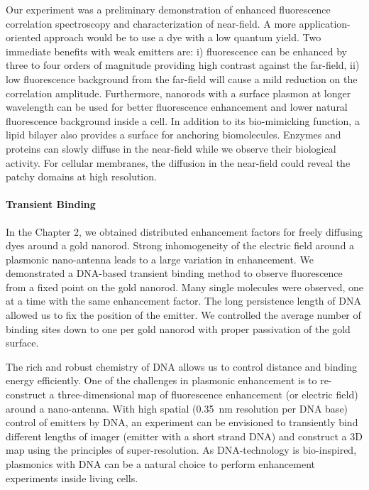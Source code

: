 Our experiment was a preliminary demonstration of enhanced fluorescence correlation spectroscopy and characterization of near-field.
A more application-oriented approach would be to use a dye with a low quantum yield.
Two immediate benefits with weak emitters are: i) fluorescence can be enhanced by three to four orders of magnitude providing high contrast against the far-field, ii) low fluorescence background from the far-field will cause a mild reduction on the correlation amplitude.
Furthermore, nanorods with a surface plasmon at longer wavelength can be used for better fluorescence enhancement and lower natural fluorescence background inside a cell.
In addition to its bio-mimicking function, a lipid bilayer also provides a surface for anchoring biomolecules.
Enzymes and proteins can slowly diffuse in the near-field while we observe their biological activity.
For cellular membranes, the diffusion in the near-field could reveal the patchy domains at high resolution.


\paragraph*{Transient Binding}
In the Chapter 2, we obtained distributed enhancement factors for freely diffusing dyes around a gold nanorod.
Strong inhomogeneity of the electric field around a plasmonic nano-antenna leads to a large variation in enhancement.
We demonstrated a DNA-based transient binding method to observe fluorescence from a fixed point on the gold nanorod.
Many single molecules were observed, one at a time with the same enhancement factor.
The long persistence length of DNA allowed us to fix the position of the emitter.
We controlled the average number of binding sites down to one per gold nanorod with proper passivation of the gold surface.


The rich and robust chemistry of DNA allows us to control distance and binding energy efficiently.
One of the challenges in plasmonic enhancement is to re-construct a three-dimensional map of fluorescence enhancement (or electric field) around a nano-antenna.
With high spatial (0.35~nm resolution per DNA base) control of emitters by DNA, an experiment can be envisioned to transiently bind different lengths of imager (emitter with a short strand DNA) and construct a 3D map using the principles of super-resolution.
As DNA-technology is bio-inspired, plasmonics with DNA can be a natural choice to perform enhancement experiments inside living cells.


